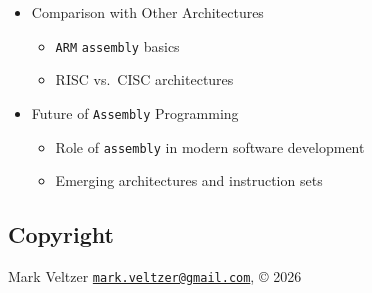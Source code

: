 \documentclass[
]{article}
\providecommand{\tightlist}{%
  \setlength{\itemsep}{0pt}\setlength{\parskip}{0pt}}
\begin{document}
\begin{itemize}
  \begin{itemize}
  \tightlist
  \item
    Code organization and commenting
  \item
    Naming conventions
  \item
    Error handling in \texttt{assembly}
  \end{itemize}
\item
  Comparison with Other Architectures

  \begin{itemize}
  \tightlist
  \item
    \texttt{ARM} \texttt{assembly} basics
  \item
    RISC vs.~CISC architectures
  \end{itemize}
\item
  Future of \texttt{Assembly} Programming

  \begin{itemize}
  \tightlist
  \item
    Role of \texttt{assembly} in modern software development
  \item
    Emerging architectures and instruction sets
  \end{itemize}
\end{itemize}

\subsection{Copyright}\label{copyright}

Mark Veltzer
\href{mailto:mark.veltzer@gmail.com}{\nolinkurl{mark.veltzer@gmail.com}},
© 2026
\end{document}
